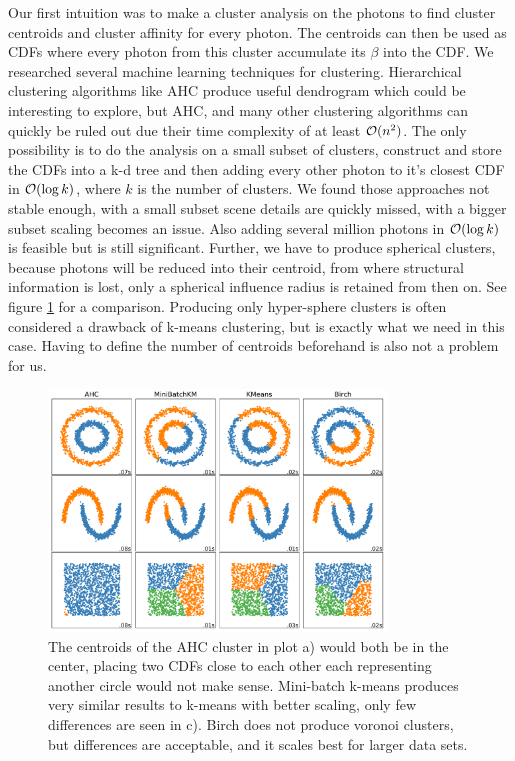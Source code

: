 Our first intuition was to make a cluster analysis on the photons to find cluster centroids and cluster affinity for every photon. The centroids can then be used as CDFs where every photon from this cluster accumulate its $\beta$ into the CDF. We researched several machine learning techniques for clustering. Hierarchical clustering algorithms like AHC produce useful dendrogram which could be interesting to explore, but AHC, and many other clustering algorithms can quickly be ruled out due their time complexity of at least $\mathcal{O}(n^2)$. The only possibility is to do the analysis on a small subset of clusters, construct and store the CDFs into a k-d tree and then adding every other photon to it's closest CDF in $\mathcal{O}(\log k)$, where $k$ is the number of clusters. We found those approaches not stable enough, with a small subset scene details are quickly missed, with a bigger subset scaling becomes an issue. Also adding several million photons in $\mathcal{O}(\log k)$ is feasible but is still significant. Further, we have to produce spherical clusters, because photons will be reduced into their centroid, from where structural information is lost, only a spherical influence radius is retained from then on. See figure \ref{fig:clustering} for a comparison. Producing only hyper-sphere clusters is often considered a drawback of k-means clustering, but is exactly what we need in this case. Having to define the number of centroids beforehand is also not a problem for us.

\begin{figure}
    \centering
    \includegraphics[width=0.8\textwidth]{figures/plots/mlclustering.pdf}
    \caption{The centroids of the AHC cluster in plot a) would both be in the center, placing two CDFs close to each other each representing another circle would not make sense. Mini-batch k-means produces very similar results to k-means with better scaling, only few differences are seen in c). Birch does not produce voronoi clusters, but differences are acceptable, and it scales best for larger data sets.}
    \label{fig:clustering}
\end{figure}
    

